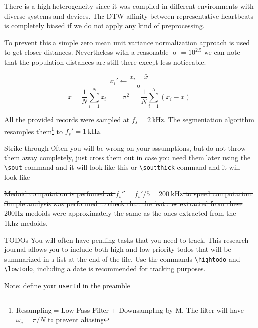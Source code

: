 \documentclass[11pt,letterpaper]{article}
\begin{document}
There is a high heterogeneity since it was compiled in different environments with diverse systems and devices. The DTW affinity between representative heartbeats is completely biased if we do not apply any kind of preprocessing.

To prevent this a simple zero mean unit variance normalization approach is used to get closer distances. Nevertheless with a reasonable $\upsigma  = 10^{2.5}$ we can note that the population distances are still there except less noticeable.

\begin{equation}
    x_i' \gets \frac{x_i-\bar{x}}{\upsigma}
\end{equation}
\begin{equation}
    \bar{x} = \frac{1}{N}\sum_{i=1}^{N} x_i \qquad \upsigma^2 = {\frac{1}{N}\sum_{i=1}^{N} (x_i-\bar{x})}
\end{equation}

All the provided records were sampled at $f_s = \SI{2}{\kilo\Hz}$. The segmentation algorithm resamples them\footnote{Resampling = Low Pass Filter + Downsampling by M. The filter will have $\omega_c = \pi/N$ to prevent aliasing} to $ f_s' = \SI{1}{\kilo\Hz}$.
\begin{tipt}{Strike-through}
 Often you will be wrong on your assumptions, but do not throw them away completely, just cross them out in case you need them later using the \texttt{\textbackslash sout} command and it will look like \sout{this} or \texttt{\textbackslash soutthick} command and it will look like 
\end{tipt}

\sout{Medoid computation is perfomed at $f_s'' = f_s'/5 = \SI{200}{\kilo\hertz}$ to speed computation. Simple analysis was performed to check that the features extracted from these 200Hz-medoids were approximately the same as the ones extracted from the  1khz-medoids.}


\begin{tipt}{TODOs}
You will often have pending tasks that you need to track. This research journal allows you to include both high and low priority todos that will be summarized in a list at the end of the file. Use the commands \texttt{\textbackslash hightodo} and \texttt{\textbackslash lowtodo}, including a date is recommended for tracking purposes.

Note: define your \texttt{userId} in the preamble
\end{tipt}
\end{document}
